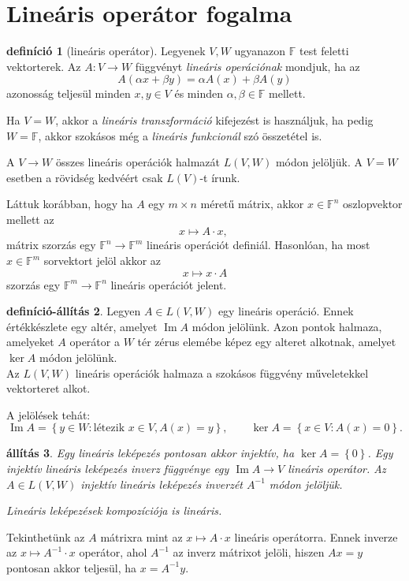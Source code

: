 \documentclass[a4paper, showtrims]{memoir}
\theoremstyle{plain}
\newtheorem{proposition}{állítás}[chapter]
\theoremstyle{remark}
\theoremstyle{definition}
\newtheorem{definition}[proposition]{definíció}
\newtheorem{defprop}[proposition]{definíció-állítás}
\DeclareMathOperator{\im}{Im}
\begin{document}
\section{Lineáris operátor fogalma}
\begin{definition}[lineáris operátor]
	Legyenek $V,W$ ugyanazon $\mathbb{F}$ test feletti vektorterek.
	Az $A:V\to W$ függvényt \emph{lineáris operációnak} mondjuk,
	ha az
	\begin{displaymath}
		A\left( \alpha x+\beta y \right)=
		\alpha A\left( x \right)+\beta A\left( y \right)
	\end{displaymath}
	azonosság teljesül minden $x,y\in V$ és minden $\alpha,\beta\in\mathbb{F}$ mellett.

	Ha $V=W$, akkor a \emph{lineáris transzformáció} kifejezést is használjuk,
	ha pedig $W=\mathbb{F}$,
	akkor szokásos még a \emph{lineáris funkcionál} szó összetétel is.

	A $V\to W$ összes lineáris operációk halmazát $L\left( V,W \right)$ módon jelöljük.
	A $V=W$ esetben a rövidség kedvéért csak $L\left( V \right)$-t írunk.
\end{definition}
Láttuk korábban, hogy ha $A$ egy $m\times n$ méretű mátrix,
akkor $x\in\mathbb{F}^n$ oszlopvektor mellett az
\[
	x\mapsto A\cdot x,\
\]
mátrix szorzás egy $\mathbb{F}^n\to\mathbb{F}^m$ lineáris operációt definiál.
Hasonlóan,
ha most $x\in\mathbb{F}^m$ sorvektort jelöl akkor az
\[
	x\mapsto x\cdot A
\]
szorzás egy $\mathbb{F}^m\to\mathbb{F}^n$ lineáris operációt jelent.

\begin{defprop}
	Legyen $A\in L\left( V,W \right)$ egy lineáris operáció.
	Ennek értékkészlete egy altér,
	amelyet $\im A$ módon jelölünk.
	Azon pontok halmaza,
	amelyeket $A$ operátor a $W$ tér zérus elemébe képez egy alteret alkotnak,
	amelyet $\ker A$ módon jelölünk.
\\
	Az $L\left( V,W \right)$ lineáris operációk halmaza a szokásos függvény műveletekkel vektorteret alkot.
\end{defprop}
A jelölések tehát:
\[
	\im A=\left\{ y\in W:\text{létezik } x\in V, A(x)=y \right\},
	\qquad
	\ker A=
	\left\{ x\in V:A\left( x \right)=0 \right\}.
\]
\begin{proposition}
	Egy lineáris leképezés pontosan akkor injektív, ha $\ker A=\left\{ 0 \right\}$.
	Egy injektív lineáris leképezés inverz függvénye egy $\im A\to V$ lineáris operátor.
	Az $A\in L\left( V,W \right)$ injektív lineáris leképezés inverzét $A^{-1}$ módon jelöljük.

	Lineáris leképezések kompozíciója is lineáris.
\end{proposition}
Tekinthetünk az $A$ mátrixra mint az $x\mapsto A\cdot x$ lineáris operátorra.
Ennek inverze az $x\mapsto A^{-1}\cdot x$ operátor,
ahol $A^{-1}$ az inverz mátrixot jelöli, hiszen
$Ax=y$ pontosan akkor teljesül, ha $x=A^{-1}y$.
\end{document}
